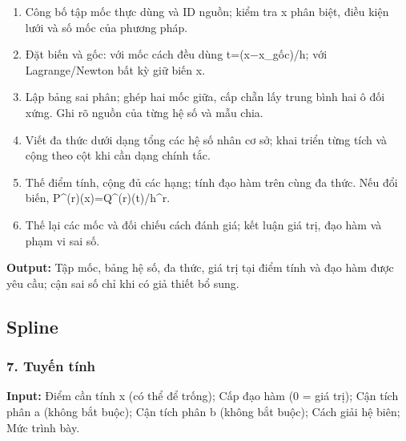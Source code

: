 \begin{enumerate}

\item Công bố tập mốc thực dùng và ID nguồn;\allowbreak{} kiểm tra x phân biệt,\allowbreak{} điều kiện lưới và số mốc của phương pháp.

\item Đặt biến và gốc: với mốc cách đều dùng t=\allowbreak{}(\allowbreak{}x\ensuremath{-}x\_gốc)/\allowbreak{}h;\allowbreak{} với Lagrange/\allowbreak{}Newton bất kỳ giữ biến x.

\item Lập bảng sai phân;\allowbreak{} ghép hai mốc giữa,\allowbreak{} cấp chẵn lấy trung bình hai ô đối xứng. Ghi rõ nguồn của từng hệ số và mẫu chia.

\item Viết đa thức dưới dạng tổng các hệ số nhân cơ sở;\allowbreak{} khai triển từng tích và cộng theo cột khi cần dạng chính tắc.

\item Thế điểm tính,\allowbreak{} cộng đủ các hạng;\allowbreak{} tính đạo hàm trên cùng đa thức. Nếu đổi biến,\allowbreak{} P\textasciicircum{}(\allowbreak{}r)(\allowbreak{}x)=\allowbreak{}Q\textasciicircum{}(\allowbreak{}r)(\allowbreak{}t)/\allowbreak{}h\textasciicircum{}r.

\item Thế lại các mốc và đối chiếu cách đánh giá;\allowbreak{} kết luận giá trị,\allowbreak{} đạo hàm và phạm vi sai số.

\end{enumerate}

\textbf{Output:} Tập mốc,\allowbreak{} bảng hệ số,\allowbreak{} đa thức,\allowbreak{} giá trị tại điểm tính và đạo hàm được yêu cầu;\allowbreak{} cận sai số chỉ khi có giả thiết bổ sung.

\subsection{Spline}

\examplebreak\subsubsection*{7. Tuyến tính}

\textbf{Input:} Điểm cần tính x (\allowbreak{}có thể để trống);\allowbreak{} Cấp đạo hàm (\allowbreak{}0 =\allowbreak{} giá trị);\allowbreak{} Cận tích phân a (\allowbreak{}không bắt buộc);\allowbreak{} Cận tích phân b (\allowbreak{}không bắt buộc);\allowbreak{} Cách giải hệ biên;\allowbreak{} Mức trình bày.

